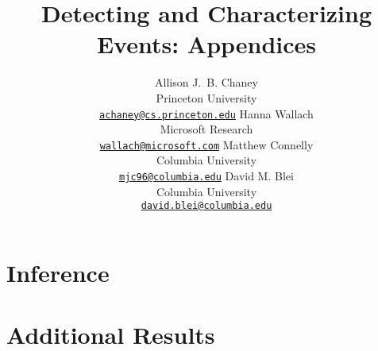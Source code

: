 \documentclass[11pt,letterpaper]{article}
\title{Detecting and Characterizing Events: Appendices}
\author{
Allison J.~B. Chaney\\
    Princeton University\\
	\href{mailto:achaney@cs.princeton.edu}{\nolinkurl{achaney@cs.princeton.edu}}
\And
Hanna Wallach\\
    Microsoft Research\\
    \href{mailto:wallach@microsoft.com}{\nolinkurl{wallach@microsoft.com}}
\AND
Matthew Connelly\\
    Columbia University\\
    \href{mailto:mjc96@columbia.edu}{\nolinkurl{mjc96@columbia.edu}}
\And
David M. Blei\\
    Columbia University\\
    \href{mailto:david.blei@columbia.edu}{\nolinkurl{david.blei@columbia.edu}}
}
\date{}
\begin{document}
\begin{multicols}{2}
\maketitle
\end{multicols}

\appendix
\section{Inference}
\label{sec:inference}


\section{Additional Results}
\label{sec:additional_results}








\end{document}
